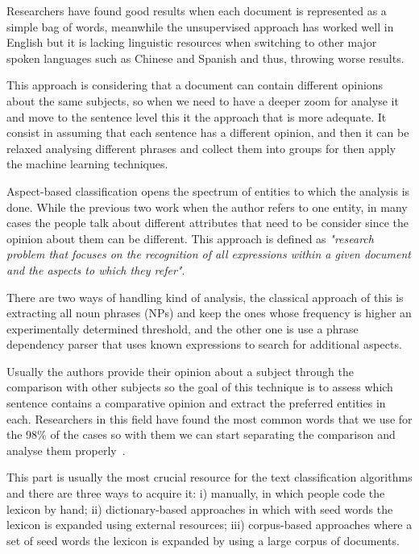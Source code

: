 Researchers have found good results when each document is represented as a simple bag of words, meanwhile the unsupervised approach has worked well in English but it is lacking linguistic resources when switching to other major spoken languages such as Chinese and Spanish and thus, throwing worse results.

This approach is considering that a document can contain different opinions about the same subjects, so when we need to have a deeper zoom for analyse it and move to the sentence level this it the approach that is more adequate. It consist in assuming that each sentence has a different opinion, and then it can be relaxed analysing different phrases and collect them into groups for then apply the machine learning techniques.

Aspect-based classification opens the spectrum of entities to which the analysis is done. While the previous two work when the author refers to one entity, in many cases the people talk about different attributes that need to be consider since the opinion about them can be different. This approach is defined as \textit{"research problem that focuses on the recognition of all expressions within a given document and the aspects to which they refer"}.

There are two ways of handling kind of analysis, the classical approach of this is extracting all noun phrases (NPs) and keep the ones whose frequency is higher an experimentally determined threshold, and the other one is use a phrase dependency parser that uses known expressions to search for additional aspects.

Usually the authors provide their opinion about a subject through the comparison with other subjects so the goal of this technique is to assess which sentence contains a comparative opinion and extract the preferred entities in each. Researchers in this field have found the most common words that we use for the 98\% of the cases so with them we can start separating the comparison and analyse them properly~\cite{jindal2006identifying}.

This part is usually the most crucial resource for the text classification algorithms and there are three ways to acquire it: i) manually, in which people code the lexicon by hand; ii) dictionary-based approaches in which with seed words the lexicon is expanded using external resources; iii) corpus-based approaches where a set of seed words the lexicon is expanded by using a large corpus of documents.\\

